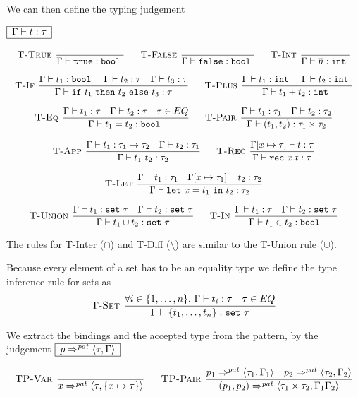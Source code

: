 \documentclass[a4paper]{article}
\newcommand{\s}[1]{\mathtt{#1}}
\newcommand{\sn}{\overline{n}}
\newcommand{\sLb}{\s{\{}}
\newcommand{\sRb}{\s{\}}}
\newcommand{\sbool}{\s{bool\ }}
\newcommand{\sint}{\s{int\ }}
\newcommand{\sseta}{\s{set\ }}
\newcommand{\sif}{\s{if\ }}
\newcommand{\sthen}{\s{\ then\ }}
\newcommand{\selse}{\s{\ else\ }}
\newcommand{\sletin}[2]{\s{let\ } #1 \s{\ in\ } #2}
\newcommand{\srec}{\s{rec\ }}
\newcommand{\strue}{\s{true}}
\newcommand{\sfalse}{\s{false}}
\newcommand{\sset}[1]{\sLb #1 \sRb}
\newcommand{\patbind}{\Rightarrow^{pat}}
\newcommand{\dotset}[2]{\{#1,\ldots,#2\}}
\newcommand{\angled}[1]{\langle #1\rangle}
\renewcommand{\rule}[3][]{\ \mbox{\textsc{#1 }}\dfrac{#2}{#3}\ }
\newcommand{\smbox}[1]{
  $\begin{array}{|c|}
    \hline
    #1 \\
    \hline
  \end{array}$
}
\begin{document}
We can then define the typing judgement
\smbox{\Gamma \vdash t : \tau}
\[\begin{array}{c}
\rule[T-True]{}{\Gamma \vdash \strue : \sbool}\quad
\rule[T-False]{}{\Gamma \vdash \sfalse : \sbool}\quad
\rule[T-Int]{}{\Gamma \vdash \sn : \sint}
\\\\
\rule[T-If]{\Gamma\vdash t_1 : \sbool \quad \Gamma\vdash t_2 : \tau \quad \Gamma\vdash t_3 : \tau}{\Gamma\vdash \sif t_1 \sthen t_2 \selse t_3 : \tau}\quad
\rule[T-Plus]{\Gamma\vdash t_1 : \sint \quad \Gamma\vdash t_2 : \sint}{\Gamma\vdash t_1 + t_2 : \sint}\\\\
\rule[T-Eq]{\Gamma\vdash t_1 : \tau \quad \Gamma\vdash t_2 : \tau
\quad \tau \in EQ}
{\Gamma\vdash t_1 = t_2 : \sbool}\quad
\rule[T-Pair]{\Gamma\vdash t_1 : \tau_1
\quad \Gamma \vdash t_2 : \tau_2}
{\Gamma \vdash (t_1, t_2) : \tau_1 \times \tau_2}
\\\\
\rule[T-App]{\Gamma\vdash t_1 : \tau_1 \to \tau_2 \quad \Gamma \vdash t_2 : \tau_1}{\Gamma \vdash t_1\ t_2 : \tau_2}\quad
\rule[T-Rec]{\Gamma[x \mapsto \tau] \vdash t : \tau}
{\Gamma\vdash \srec x. t : \tau}
\\\\
\rule[T-Let]{\Gamma \vdash t_1 : \tau_1
\quad \Gamma[x \mapsto \tau_1] \vdash t_2 : \tau_2}
{\Gamma\vdash \sletin{x = t_1}{t_2} : \tau_2}
\\\\
\rule[T-Union]{\Gamma\vdash t_1 : \s{set}\ \tau
\quad \Gamma \vdash t_2 : \s{set}\ \tau}
{\Gamma \vdash t_1 \cup t_2 : \s{set}\ \tau}
\quad
\rule[T-In]{\Gamma\vdash t_1 : \tau
\quad \Gamma \vdash t_2 : \s{set}\ \tau}
{\Gamma \vdash t_1 \in t_2 : \sbool}
\end{array}
\]

The rules for T-Inter ($\cap$) and T-Diff ($\setminus$) are similar
to the T-Union rule ($\cup$).

Because every element of a set has to be an equality type we define the type inference rule for sets as
\[
\rule[T-Set]{\forall i\in \dotset{1}{n}.\ \Gamma\vdash t_i : \tau \quad \tau \in EQ}{\Gamma\vdash\sset{t_1,\ldots,t_n} : \sseta \tau}
\]

We extract the bindings and the accepted type from the
pattern, by the judgement \smbox{p \patbind \angled{\tau,\Gamma}}
\[
\rule[TP-Var]{}{x \patbind \angled{\tau,\{x \mapsto \tau\}}}\quad
\rule[TP-Pair]{p_1 \patbind \angled{\tau_1,\Gamma_1}\quad p_2 \patbind \angled{\tau_2,\Gamma_2}}
{(p_1, p_2) \patbind \angled{\tau_1\times\tau_2,\Gamma_1\Gamma_2}}
\]
\end{document}

